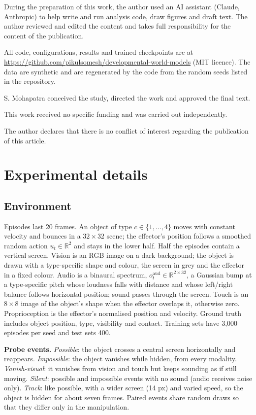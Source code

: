 \documentclass{article}
\theoremstyle{plain}
\theoremstyle{remark}
\begin{document}
\clearpage
During the preparation of this work, the author used an AI assistant (Claude, Anthropic) to help write and run analysis code, draw figures and draft text. The author reviewed and edited the content and takes full responsibility for the content of the publication.

All code, configurations, results and trained checkpoints are at \url{https://github.com/pikulsomesh/developmental-world-models} (MIT licence). The data are synthetic and are regenerated by the code from the random seeds listed in the repository.

S. Mohapatra conceived the study, directed the work and approved the final text.

This work received no specific funding and was carried out independently.

The author declares that there is no conflict of interest regarding the publication of this article.

\printbibliography

\clearpage
\appendix
\section{Experimental details}
\label{app:details}

\subsection{Environment}
\label{app:env}

Episodes last 20 frames. An object of type \(c\in\{1,\dots,4\}\) moves with constant velocity and bounces in a \(32\times32\) scene; the effector's position follows a smoothed random action \(u_t\in\mathbb R^2\) and stays in the lower half. Half the episodes contain a vertical screen. Vision is an RGB image on a dark background; the object is drawn with a type-specific shape and colour, the screen in grey and the effector in a fixed colour. Audio is a binaural spectrum, \(o^{\text{aud}}_t\in\mathbb R^{2\times32}\), a Gaussian bump at a type-specific pitch whose loudness falls with distance and whose left/right balance follows horizontal position; sound passes through the screen. Touch is an \(8\times8\) image of the object's shape when the effector overlaps it, otherwise zero. Proprioception is the effector's normalised position and velocity. Ground truth includes object position, type, visibility and contact. Training sets have 3,000 episodes per seed and test sets 400.

\textbf{Probe events.} \emph{Possible}: the object crosses a central screen horizontally and reappears. \emph{Impossible}: the object vanishes while hidden, from every modality. \emph{Vanish-visual}: it vanishes from vision and touch but keeps sounding as if still moving. \emph{Silent}: possible and impossible events with no sound (audio receives noise only). \emph{Track}: like possible, with a wider screen (14 px) and varied speed, so the object is hidden for about seven frames. Paired events share random draws so that they differ only in the manipulation.
\end{document}
